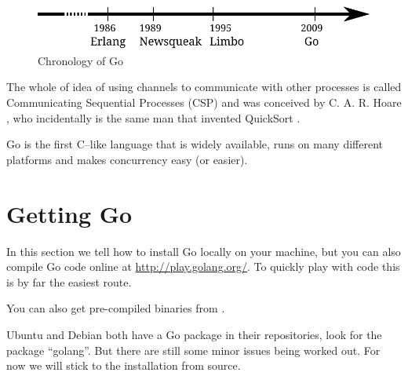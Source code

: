 \begin{figure}[H]
\caption{Chronology of Go}
\label{fig:chrono-of-go}
\begin{center}
\includegraphics[scale=0.65]{fig/go-history.pdf}
\end{center}
\end{figure}

The whole of idea of using channels to communicate with other processes
is called Communicating Sequential Processes (CSP) and was conceived
by C. A. R. Hoare \cite{hoare}, who incidentally is the same man that
invented QuickSort \cite{quicksort}.

\begin{lbar}[]
Go is the first C--like language that is widely available,
runs on many
different platforms and makes concurrency easy (or easier).
\end{lbar}

\section{Getting Go}
In this section we tell how to install Go locally on your machine, but you can
also compile Go code online at \url{http://play.golang.org/}. To quickly
play with code this is by far the easiest route.

You can also get pre-compiled binaries from \cite{go_install}.

Ubuntu and Debian both have a Go package in their repositories, look for
the package ``golang''. But there are still some minor issues being worked
out. For now we will stick to the installation from source.

